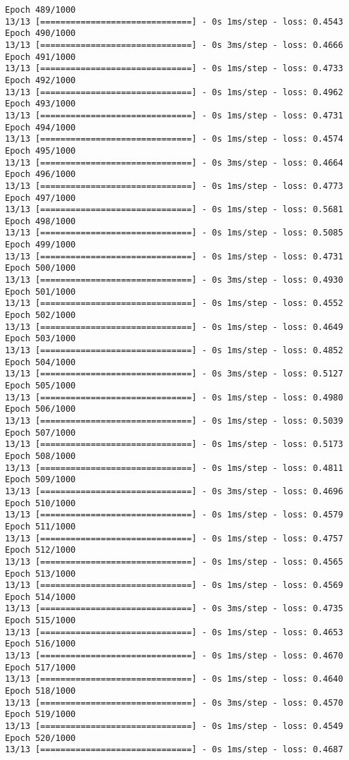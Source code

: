 \documentclass[11pt]{article}
\begin{document}
\begin{Verbatim}[commandchars=\\\{\}]
Epoch 489/1000
13/13 [==============================] - 0s 1ms/step - loss: 0.4543
Epoch 490/1000
13/13 [==============================] - 0s 3ms/step - loss: 0.4666
Epoch 491/1000
13/13 [==============================] - 0s 1ms/step - loss: 0.4733
Epoch 492/1000
13/13 [==============================] - 0s 1ms/step - loss: 0.4962
Epoch 493/1000
13/13 [==============================] - 0s 1ms/step - loss: 0.4731
Epoch 494/1000
13/13 [==============================] - 0s 1ms/step - loss: 0.4574
Epoch 495/1000
13/13 [==============================] - 0s 3ms/step - loss: 0.4664
Epoch 496/1000
13/13 [==============================] - 0s 1ms/step - loss: 0.4773
Epoch 497/1000
13/13 [==============================] - 0s 1ms/step - loss: 0.5681
Epoch 498/1000
13/13 [==============================] - 0s 1ms/step - loss: 0.5085
Epoch 499/1000
13/13 [==============================] - 0s 1ms/step - loss: 0.4731
Epoch 500/1000
13/13 [==============================] - 0s 3ms/step - loss: 0.4930
Epoch 501/1000
13/13 [==============================] - 0s 1ms/step - loss: 0.4552
Epoch 502/1000
13/13 [==============================] - 0s 1ms/step - loss: 0.4649
Epoch 503/1000
13/13 [==============================] - 0s 1ms/step - loss: 0.4852
Epoch 504/1000
13/13 [==============================] - 0s 3ms/step - loss: 0.5127
Epoch 505/1000
13/13 [==============================] - 0s 1ms/step - loss: 0.4980
Epoch 506/1000
13/13 [==============================] - 0s 1ms/step - loss: 0.5039
Epoch 507/1000
13/13 [==============================] - 0s 1ms/step - loss: 0.5173
Epoch 508/1000
13/13 [==============================] - 0s 1ms/step - loss: 0.4811
Epoch 509/1000
13/13 [==============================] - 0s 3ms/step - loss: 0.4696
Epoch 510/1000
13/13 [==============================] - 0s 1ms/step - loss: 0.4579
Epoch 511/1000
13/13 [==============================] - 0s 1ms/step - loss: 0.4757
Epoch 512/1000
13/13 [==============================] - 0s 1ms/step - loss: 0.4565
Epoch 513/1000
13/13 [==============================] - 0s 1ms/step - loss: 0.4569
Epoch 514/1000
13/13 [==============================] - 0s 3ms/step - loss: 0.4735
Epoch 515/1000
13/13 [==============================] - 0s 1ms/step - loss: 0.4653
Epoch 516/1000
13/13 [==============================] - 0s 1ms/step - loss: 0.4670
Epoch 517/1000
13/13 [==============================] - 0s 1ms/step - loss: 0.4640
Epoch 518/1000
13/13 [==============================] - 0s 3ms/step - loss: 0.4570
Epoch 519/1000
13/13 [==============================] - 0s 1ms/step - loss: 0.4549
Epoch 520/1000
13/13 [==============================] - 0s 1ms/step - loss: 0.4687

\end{Verbatim}
\end{document}
